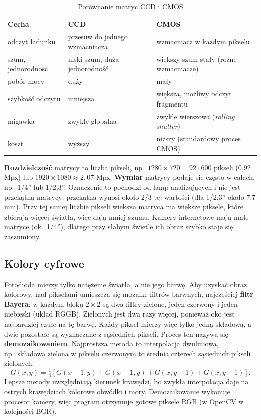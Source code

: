 \begin{table}[H]
  \centering
  \caption{Porównanie matryc CCD i CMOS}
  \label{tab:matryce}
  \begin{tabularx}{\textwidth}{lXX}
    \toprule
    Cecha & CCD & CMOS \\
    \midrule
    odczyt ładunku & przesuw do jednego wzmacniacza & wzmacniacz w każdym pikselu \\
    szum, jednorodność & niski szum, duża jednorodność & większy szum stały (różne wzmacniacze) \\
    pobór mocy & duży & mały \\
    szybkość odczytu & mniejsza & większa, możliwy odczyt fragmentu \\
    migawka & zwykle globalna & zwykle wierszowa (\emph{rolling shutter}) \\
    koszt & wyższy & niższy (standardowy proces CMOS) \\
    \bottomrule
  \end{tabularx}
\end{table}

\textbf{Rozdzielczość} matrycy to liczba pikseli, np.\ $1280\times720 = 921\,600$ pikseli
(0,92 Mpx) lub $1920\times1080 \approx 2{,}07$ Mpx. \textbf{Wymiar} matrycy podaje się często
w calach, np.\ 1/4'' lub 1/2,3''. Oznaczenie to pochodzi od lamp analizujących i nie jest
przekątną matrycy; przekątna wynosi około 2/3 tej wartości (dla 1/2,3'' około 7,7\,mm). Przy
tej samej liczbie pikseli większa matryca ma większe piksele, które zbierają więcej światła,
więc dają mniej szumu. Kamery internetowe mają małe matryce (ok.\ 1/4''), dlatego przy słabym
świetle ich obraz szybko staje się zaszumiony.

\subsection{Kolory cyfrowe}
Fotodioda mierzy tylko natężenie światła, a nie jego barwę. Aby uzyskać obraz kolorowy, nad
pikselami umieszcza się mozaikę filtrów barwnych, najczęściej \textbf{filtr Bayera}: w każdym
bloku $2\times2$ są dwa filtry zielone, jeden czerwony i jeden niebieski (układ RGGB). Zielonych
jest dwa razy więcej, ponieważ oko jest najbardziej czułe na tę barwę. Każdy piksel mierzy więc
tylko jedną składową, a dwie pozostałe są wyznaczane z sąsiednich pikseli. Proces ten nazywa się
\textbf{demozaikowaniem}. Najprostsza metoda to interpolacja dwuliniowa, np.\ składowa zielona
w pikselu czerwonym to średnia czterech sąsiednich pikseli zielonych:
\begin{equation}
  G(x,y) = \tfrac{1}{4}\left[G(x-1,y) + G(x+1,y) + G(x,y-1) + G(x,y+1)\right].
\end{equation}
Lepsze metody uwzględniają kierunek krawędzi, bo zwykła interpolacja daje na ostrych krawędziach
kolorowe obwódki i mory. Demozaikowanie wykonuje procesor kamery, więc program otrzymuje gotowe
piksele RGB (w OpenCV w kolejności BGR).

